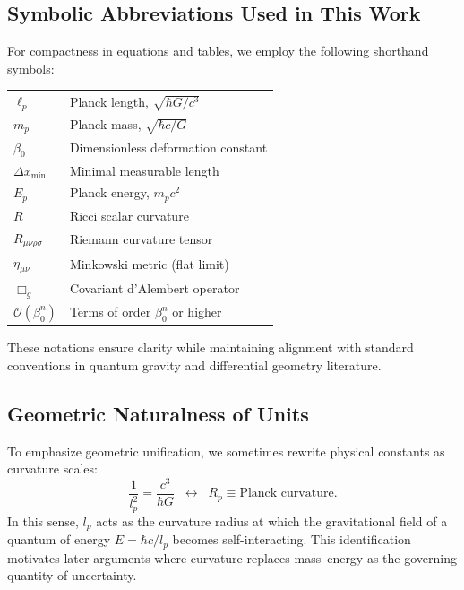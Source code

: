 \documentclass[11pt,oneside]{book}
\numberwithin{equation}{chapter}
\newcommand{\lp}{\ell_p}             %
\newcommand{\mpx}{m_p}               %
\newcommand{\betaz}{\beta_0}
\begin{document}
\subsection*{Symbolic Abbreviations Used in This Work}

For compactness in equations and tables, we employ the following shorthand symbols:

\begin{center}
\begin{tabular}{ll}
$\lp$ & Planck length, $\sqrt{\hbar G/c^3}$ \\[3pt]
$\mpx$ & Planck mass, $\sqrt{\hbar c/G}$ \\[3pt]
$\betaz$ & Dimensionless deformation constant \\[3pt]
$\Delta x_{\min}$ & Minimal measurable length \\[3pt]
$E_p$ & Planck energy, $\mpx c^2$ \\[3pt]
$R$ & Ricci scalar curvature \\[3pt]
$R_{\mu\nu\rho\sigma}$ & Riemann curvature tensor \\[3pt]
$\eta_{\mu\nu}$ & Minkowski metric (flat limit) \\[3pt]
$\Box_g$ & Covariant d’Alembert operator \\[3pt]
$\mathcal{O}(\betaz^n)$ & Terms of order $\betaz^n$ or higher
\end{tabular}
\end{center}

These notations ensure clarity while maintaining alignment with standard conventions in quantum gravity and differential geometry literature.

\subsection*{Geometric Naturalness of Units}

To emphasize geometric unification, we sometimes rewrite physical constants as curvature scales:
\begin{equation}
\frac{1}{l_p^2} = \frac{c^3}{\hbar G} 
\;\;\longleftrightarrow\;\;
R_p \equiv \text{Planck curvature}.
\end{equation}
In this sense, $l_p$ acts as the curvature radius at which the gravitational field of a quantum of energy $E=\hbar c/l_p$ becomes self-interacting.  
This identification motivates later arguments where curvature replaces mass–energy as the governing quantity of uncertainty.\vspace{0.8em}
\end{document}
